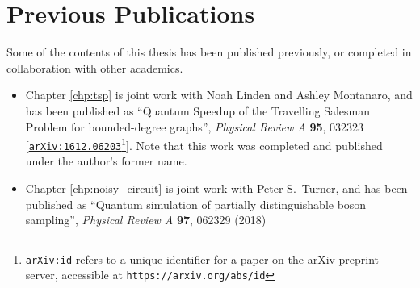 \chapter*{Previous Publications}

Some of the contents of this thesis has been published previously, or completed in collaboration with other academics.

\begin{itemize}
\item Chapter \ref{chp:tsp} is joint work with Noah Linden and Ashley Montanaro, and has been published as ``Quantum Speedup of the Travelling Salesman Problem for bounded-degree graphs'', \textit{Physical Review A} \textbf{95}, 032323 [{\tt \href{https://arxiv.org/abs/1612.06203}{arXiv:1612.06203}}\footnote{{\tt arXiv:id} refers to a unique identifier for a paper on the arXiv preprint server, accessible at {\tt https://arxiv.org/abs/id}}]. Note that this work was completed and published under the author's former name.
\item Chapter \ref{chp:noisy_circuit} is joint work with Peter S.\ Turner, and has been published as ``Quantum simulation of partially distinguishable boson sampling'', \textit{Physical Review A} \textbf{97}, 062329 (2018)
\end{itemize}